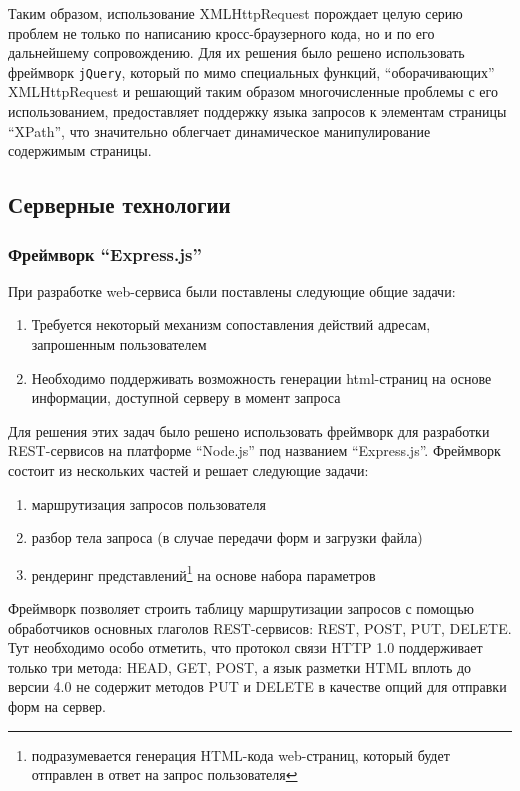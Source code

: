 \documentclass[12pt, a4paper]{article}
\begin{document}
Таким образом, использование XMLHttpRequest порождает целую серию проблем не
только по написанию кросс-браузерного кода, но и по его дальнейшему
сопровождению. Для их решения было решено использовать фреймворк
\texttt{jQuery}, который по мимо специальных функций, ``оборачивающих''
XMLHttpRequest и решающий таким образом многочисленные проблемы с его
использованием, предоставляет поддержку языка запросов к элементам страницы
``XPath'', что значительно облегчает динамическое манипулирование содержимым
страницы.

\subsection{Серверные технологии}

\subsubsection{Фреймворк ``Express.js''}

При разработке web-сервиса были поставлены следующие общие задачи:

\begin{enumerate}
    \item Требуется некоторый механизм сопоставления действий адресам, запрошенным
    пользователем
    \item Необходимо поддерживать возможность генерации html-страниц на основе
    информации, доступной серверу в момент запроса
\end{enumerate}

Для решения этих задач было решено использовать фреймворк для разработки
REST-сервисов на платформе ``Node.js'' под названием ``Express.js''. Фреймворк
состоит из нескольких частей и решает следующие задачи:

\begin{enumerate}
    \item маршрутизация запросов пользователя
    \item разбор тела запроса (в случае передачи форм и загрузки файла)
    \item рендеринг представлений\footnote{подразумевается генерация HTML-кода
    web-страниц, который будет отправлен в ответ на запрос
    пользователя} на основе набора параметров
\end{enumerate}

Фреймворк позволяет строить таблицу маршрутизации запросов с помощью
обработчиков основных глаголов REST-сервисов: REST, POST, PUT, DELETE. Тут
необходимо особо отметить, что протокол связи HTTP 1.0 поддерживает только три
метода: HEAD, GET, POST, а язык разметки HTML вплоть до версии 4.0 не содержит
методов PUT и DELETE в качестве опций для отправки форм на сервер.
\end{document}
